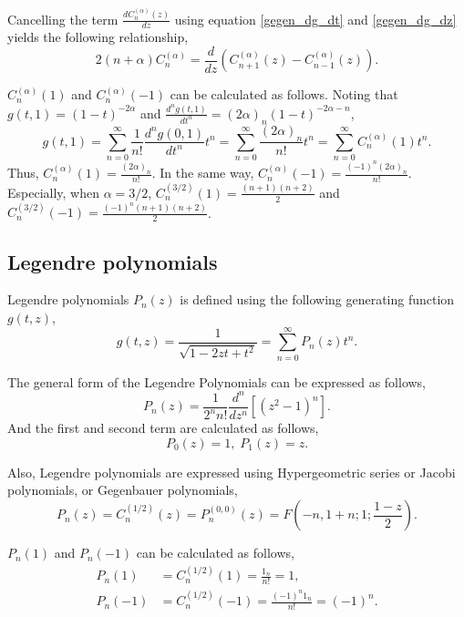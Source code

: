 \documentclass[12pt]{article}
\newcommand{\bibun}[2]{\frac{d {#1}}{d {#2}}}
\begin{document}
Cancelling the term $\bibun{C^{(\alpha)}_{n} (z)}{z}$ using equation \eqref{gegen_dg_dt} and \eqref{gegen_dg_dz} yields the following relationship,
\begin{equation}
 2(n+\alpha) C^{(\alpha)}_{n} = \bibun{}{z} \left( C^{(\alpha)}_{n+1} (z) - C^{(\alpha)}_{n-1} (z) \right).\label{gegen_diff}
\end{equation}

$C^{(\alpha)}_n (1)$ and $C^{(\alpha)}_n (-1)$ can be calculated as follows.
Noting that $g(t,1) = (1-t)^{-2\alpha}$ and $\frac{d^n g(t,1)}{dt^n} = (2\alpha)_n (1-t)^{-2\alpha - n}$,
\begin{equation}
 g(t,1) = \sum_{n=0}^{\infty} \frac{1}{n!} \frac{d^n g(0,1)}{dt^n} t^n = \sum_{n=0}^{\infty} \frac{(2\alpha)_n}{n!} t^n = \sum_{n=0}^{\infty} C^{(\alpha)}_n (1) t^n.
\end{equation}
Thus, $C^{(\alpha)}_n (1) = \frac{(2\alpha)_n}{n!}$. In the same way, $C^{(\alpha)}_n (-1) = \frac{(-1)^{n} (2\alpha)_n}{n!}$.
Especially, when $\alpha=3/2$,
$C^{(3/2)}_n (1) = \frac{(n+1)(n+2)}{2}$ and $C^{(3/2)}_n (-1) = \frac{(-1)^n (n+1)(n+2)}{2}$.

\subsection{Legendre polynomials}
Legendre polynomials $P_n(z)$ is defined using the following generating function $g(t,z)$,
\begin{equation}
 g(t,z) = \frac{1}{\sqrt{1 - 2zt + t^2}} = \sum_{n=0}^{\infty} P_n(z) t^n.
\end{equation}

The general form of the Legendre Polynomials can be expressed as follows,
\begin{equation}
 P_n (z) = \frac{1}{2^n n!} \frac{d^n}{dz^n}\left[ (z^2 - 1)^n \right].
\end{equation}
And the first and second term are calculated as follows,
\begin{equation}
 P_0(z) = 1, \; P_1(z) = z.
\end{equation}

Also, Legendre polynomials are expressed using Hypergeometric series or Jacobi polynomials, or Gegenbauer polynomials,
\begin{equation}
 P_n(z) = C^{(1/2)}_n(z) = P^{(0, 0)}_n (z) = F\left(-n, 1+n; 1; \frac{1-z}{2}\right).
\end{equation}

$P_n(1)$ and $P_n(-1)$ can be calculated as follows,
\begin{align}
 P_n(1) &= C^{(1/2)}_n(1) = \frac{1_n}{n!} = 1,\label{legendre1}\\
 P_n(-1) &= C^{(1/2)}_n(-1) = \frac{(-1)^n 1_n}{n!} = (-1)^n.\label{legendre-1}
\end{align}
\end{document}
